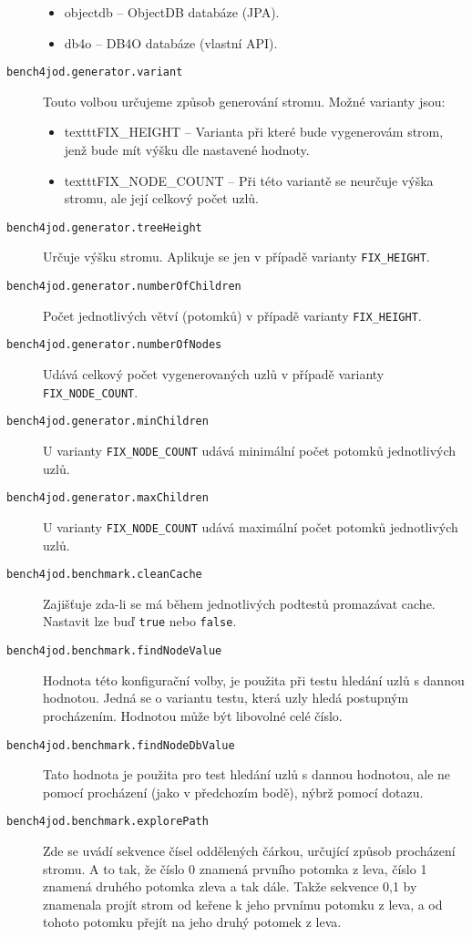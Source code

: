 \begin{description}
\begin{itemize}
     \item objectdb -- ObjectDB databáze (JPA).
     \item db4o -- DB4O databáze (vlastní API).
   \end{itemize}
   \item[\texttt{bench4jod.generator.variant}] Touto volbou určujeme způsob generování stromu. Možné varianty jsou:
   \begin{itemize}
     \item texttt{FIX\_HEIGHT} -- Varianta při které bude vygenerovám strom, jenž bude mít výšku dle nastavené hodnoty.
     \item texttt{FIX\_NODE\_COUNT} -- Při této variantě se neurčuje výška stromu, ale její celkový počet uzlů.
   \end{itemize}
   \item[\texttt{bench4jod.generator.treeHeight}] Určuje výšku stromu. Aplikuje se jen v případě varianty \texttt{FIX\_HEIGHT}.
   \item[\texttt{bench4jod.generator.numberOfChildren}] Počet jednotlivých větví (potomků) v případě varianty \texttt{FIX\_HEIGHT}.
   \item[\texttt{bench4jod.generator.numberOfNodes}] Udává celkový počet vygenerovaných uzlů v případě varianty \texttt{FIX\_NODE\_COUNT}.
   \item[\texttt{bench4jod.generator.minChildren}] U varianty \texttt{FIX\_NODE\_COUNT} udává minimální počet potomků jednotlivých uzlů.
   \item[\texttt{bench4jod.generator.maxChildren}] U varianty \texttt{FIX\_NODE\_COUNT} udává maximální počet potomků jednotlivých uzlů.
   \item[\texttt{bench4jod.benchmark.cleanCache}] Zajišťuje zda-li se má během jednotlivých podtestů promazávat cache. Nastavit lze buď \texttt{true} nebo \texttt{false}.
   \item[\texttt{bench4jod.benchmark.findNodeValue}] Hodnota této konfigurační volby, je použita při testu hledání uzlů s dannou hodnotou. Jedná se o variantu testu, která uzly hledá postupným procházením. Hodnotou může být libovolné celé číslo.
   \item[\texttt{bench4jod.benchmark.findNodeDbValue}] Tato hodnota je použita pro test hledání uzlů s dannou hodnotou, ale ne pomocí procházení (jako v předchozím bodě), nýbrž pomocí dotazu.
   \item[\texttt{bench4jod.benchmark.explorePath}] Zde se uvádí sekvence čísel oddělených čárkou, určující způsob procházení stromu. A to tak, že číslo 0 znamená prvního potomka z leva, číslo 1 znamená druhého potomka zleva a tak dále. Takže sekvence 0,1 by znamenala projít strom od keřene k jeho prvnímu potomku z leva, a od tohoto potomku přejít na jeho druhý potomek z leva.
\end{description}
